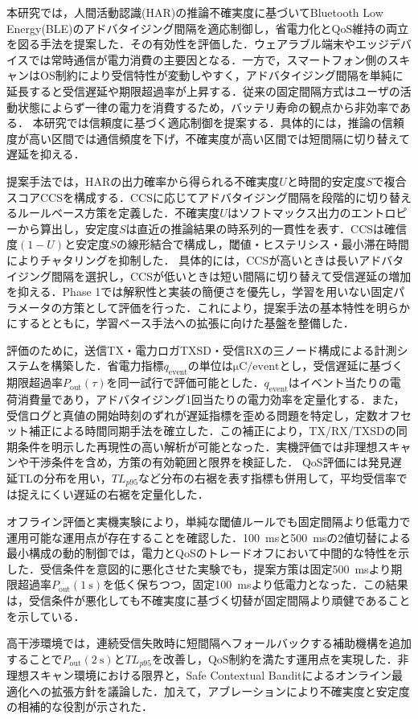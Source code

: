 ﻿%
本研究では，人間活動認識(HAR)の推論不確実度に基づいてBluetooth Low Energy(BLE)のアドバタイジング間隔を適応制御し，省電力化とQoS維持の両立を図る手法を提案した．その有効性を評価した．ウェアラブル端末やエッジデバイスでは常時通信が電力消費の主要因となる．一方で，スマートフォン側のスキャンはOS制約により受信特性が変動しやすく，アドバタイジング間隔を単純に延長すると受信遅延や期限超過率が上昇する．従来の固定間隔方式はユーザの活動状態によらず一律の電力を消費するため，バッテリ寿命の観点から非効率である．
本研究では信頼度に基づく適応制御を提案する．具体的には，推論の信頼度が高い区間では通信頻度を下げ，不確実度が高い区間では短間隔に切り替えて遅延を抑える．

提案手法では，HARの出力確率から得られる不確実度$U$と時間的安定度$S$で複合スコアCCSを構成する．CCSに応じてアドバタイジング間隔を段階的に切り替えるルールベース方策を定義した．不確実度$U$はソフトマックス出力のエントロピーから算出し，安定度$S$は直近の推論結果の時系列的一貫性を表す．CCSは確信度$(1-U)$と安定度$S$の線形結合で構成し，閾値・ヒステリシス・最小滞在時間によりチャタリングを抑制した．
具体的には，CCSが高いときは長いアドバタイジング間隔を選択し，CCSが低いときは短い間隔に切り替えて受信遅延の増加を抑える．Phase 1では解釈性と実装の簡便さを優先し，学習を用いない固定パラメータの方策として評価を行った．これにより，提案手法の基本特性を明らかにするとともに，学習ベース手法への拡張に向けた基盤を整備した．

評価のために，送信TX・電力ロガTXSD・受信RXの三ノード構成による計測システムを構築した．省電力指標$q_{\mathrm{event}}$の単位は$\si{\micro\coulomb}/\text{event}$とし，受信遅延に基づく期限超過率$P_{\mathrm{out}}(\tau)$を同一試行で評価可能とした．$q_{\mathrm{event}}$はイベント当たりの電荷消費量であり，アドバタイジング1回当たりの電力効率を定量化する．また，受信ログと真値の開始時刻のずれが遅延指標を歪める問題を特定し，定数オフセット補正による時間同期手法を確立した．この補正により，TX/RX/TXSDの同期条件を明示した再現性の高い解析が可能となった．実機評価では非理想スキャンや干渉条件を含め，方策の有効範囲と限界を検証した．
QoS評価には発見遅延TLの分布を用い，$TL_{p95}$など分布の右裾を表す指標も併用して，平均受信率では捉えにくい遅延の右裾を定量化した．

オフライン評価と実機実験により，単純な閾値ルールでも固定間隔より低電力で運用可能な運用点が存在することを確認した．\SI{100}{\milli\second}と\SI{500}{\milli\second}の2値切替による最小構成の動的制御では，電力とQoSのトレードオフにおいて中間的な特性を示した．受信条件を意図的に悪化させた実験でも，提案方策は固定\SI{500}{\milli\second}より期限超過率$P_{\mathrm{out}}(\SI{1}{\second})$を低く保ちつつ，固定\SI{100}{\milli\second}より低電力となった．この結果は，受信条件が悪化しても不確実度に基づく切替が固定間隔より頑健であることを示している．

高干渉環境では，連続受信失敗時に短間隔へフォールバックする補助機構を追加することで$P_{\mathrm{out}}(\SI{2}{\second})$と$TL_{p95}$を改善し，QoS制約を満たす運用点を実現した．非理想スキャン環境における限界と，Safe Contextual Banditによるオンライン最適化への拡張方針を議論した．加えて，アブレーションにより不確実度と安定度の相補的な役割が示された．

